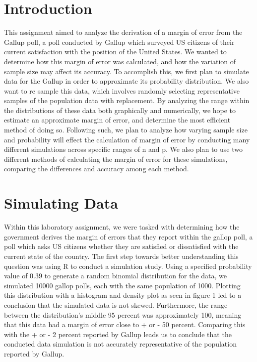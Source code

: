 \documentclass{article}\usepackage[]{graphicx}\usepackage[]{xcolor}
\begin{document}
\begin{multicols}{2}
\section{Introduction}
This assignment aimed to analyze the derivation of a margin of error from the Gallup poll, a poll conducted by Gallup which surveyed US citizens of their current satisfaction with the position of the United States. We wanted to determine how this margin of error was calculated, and how the variation of sample size may affect its accuracy. To accomplish this, we first plan to simulate data for the Gallup in order to approximate its probability distribution. We also want to re sample this data, which involves randomly selecting representative samples of the population data with replacement. By analyzing the range within the distributions of these data both graphically and numerically, we hope to estimate an approximate margin of error, and determine the most efficient method of doing so. Following such, we plan to analyze how varying sample size and probability will effect the calculation of margin of error by conducting many different simulations across specific ranges of n and p. We also plan to use two different methods of calculating the margin of error for these simulations, comparing the differences and accuracy among each method.



\section{Simulating Data}
Within this laboratory assignment, we were tasked with determining how the government derives the margin of errors that they report within the gallop poll, a poll which asks US citizens whether they are satisfied or dissatisfied with the current state of the country. The first step towards better understanding this question was using R to conduct a simulation study. Using a specified probability value of 0.39 to generate a random binomial distribution for the data, we simulated 10000 gallop polls, each with the same population of 1000. Plotting this distribution with a histogram and density plot as seen in figure 1 led to a conclusion that the simulated data is not skewed. Furthermore, the range between the distribution's middle 95 percent was approximately 100, meaning that this data had a margin of error close to + or - 50 percent. Comparing this with the + or - 2 percent reported by Gallup leads us to conclude that the conducted data simulation is not accurately representative of the population reported by Gallup.


\end{multicols}
\end{document}
